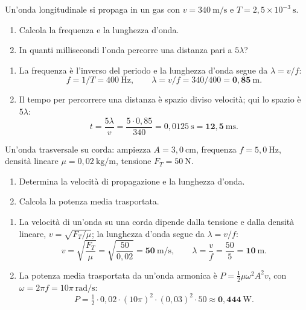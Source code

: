 \begin{question}[ID=1.5, subtitle={Onda longitudinale — frequenza, lunghezza d'onda e tempo per 5λ}, tags={onde, velocità, periodo}, difficulty=media]
Un'onda longitudinale si propaga in un gas con $v = 340\ \mathrm{m/s}$ e $T = 2{,}5\times10^{-3}\ \mathrm{s}$.
\begin{enumerate}
\item Calcola la frequenza e la lunghezza d'onda.
\item In quanti millisecondi l'onda percorre una distanza pari a $5\lambda$?
\end{enumerate}
\begin{solution}
\begin{enumerate}
\item La frequenza è l'inverso del periodo e la lunghezza d'onda segue da $\lambda = v/f$:
\[
f = 1/T = 400\ \mathrm{Hz}, \qquad \lambda = v/f = 340/400 = \mathbf{0{,}85\ \mathrm{m}}.
\]
\item Il tempo per percorrere una distanza è spazio diviso velocità; qui lo spazio è $5\lambda$:
\[
t = \frac{5\lambda}{v} = \frac{5\cdot 0{,}85}{340} = 0{,}0125\ \mathrm{s} = \mathbf{12{,}5\ \mathrm{ms}}.
\]
\end{enumerate}
\end{solution}
\end{question}

\begin{question}[ID=1.6, subtitle={Onda trasversale su corda — velocità e potenza media}, tags={onde, energia, potenza}, difficulty=difficile]
Un'onda trasversale su corda: ampiezza $A = 3{,}0\ \mathrm{cm}$, frequenza $f = 5{,}0\ \mathrm{Hz}$, densità lineare $\mu = 0{,}02\ \mathrm{kg/m}$, tensione $F_T = 50\ \mathrm{N}$.
\begin{enumerate}
\item Determina la velocità di propagazione e la lunghezza d'onda.
\item Calcola la potenza media trasportata.
\end{enumerate}
\begin{solution}
\begin{enumerate}
\item La velocità di un'onda su una corda dipende dalla tensione e dalla densità lineare, $v = \sqrt{F_T/\mu}$; la lunghezza d'onda segue da $\lambda = v/f$:
\[
v = \sqrt{\frac{F_T}{\mu}} = \sqrt{\frac{50}{0{,}02}} = \mathbf{50\ \mathrm{m/s}}, \qquad \lambda = \frac{v}{f} = \frac{50}{5} = \mathbf{10\ \mathrm{m}}.
\]
\item La potenza media trasportata da un'onda armonica è $P = \tfrac{1}{2}\mu\omega^2 A^2 v$, con $\omega = 2\pi f = 10\pi\ \mathrm{rad/s}$:
\[
P = \tfrac{1}{2}\cdot 0{,}02\cdot(10\pi)^2\cdot(0{,}03)^2\cdot 50 \approx \mathbf{0{,}444\ \mathrm{W}}.
\]
\end{enumerate}
\end{solution}
\end{question}



